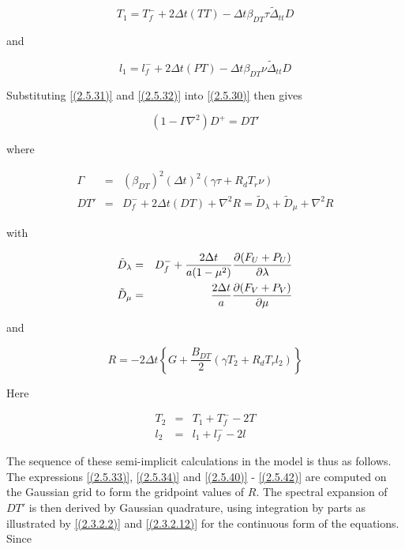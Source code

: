 \begin{equation}
T_1 = T^-_f + 2\Delta t (TT) - \Delta t \beta_{DT} \tau \tilde\Delta_{tt}D
\label{(2.5.33)}
\end{equation}

and

\begin{equation}
l_1 = l^-_f + 2\Delta t (PT) - \Delta t \beta_{DT} \nu \tilde\Delta_{tt}D
\label{(2.5.34)}
\end{equation}

Substituting \ref{(2.5.31)} and \ref{(2.5.32)} into \ref{(2.5.30)} then gives

\begin{equation}
(1 - \Gamma\nabla^2) D^+ = DT'
\label{(2.5.35)}
\end{equation}

where

\begin{eqnarray}
\Gamma & = & (\beta_{DT})^2(\Delta t)^2 (\gamma\tau +  R_dT_r\nu)
\label{(2.5.36)}\\
DT' & = & D^-_f + 2\Delta t(DT) + \nabla^2 R = \tilde{D}_{\lambda}
+ \tilde{D}_{\mu} + \nabla^2 R
\label{(2.5.37)}
\end{eqnarray}

with

\begin{eqnarray}
\tilde{D}_{\lambda} & = & D^-_f + \frac{2\Delta t}{a(1-\mu^2)}
\frac {\partial (F_U+P_U)} {\partial \lambda}
\label{(2.5.38)}\\
\tilde{D}_{\mu} & = & \frac{2\Delta t}{a}
\frac {\partial (F_V+P_V)} {\partial \mu}
\label{(2.5.39)}
\end{eqnarray}

and

\begin{equation}
R = - 2\Delta t\left\{G + \frac{B_{DT}}{2}
(\gamma T_2 + R_dT_rl_2)\right\}
\label{(2.5.40)}
\end{equation}

Here


\begin{eqnarray}
T_2 & = & T_1 + T^-_f - 2T
\label{(2.5.41)}\\
l_2 & = & l_1 + l^-_f - 2l
\label{(2.5.42)}
\end{eqnarray}

The sequence of these semi-implicit calculations in the model is thus
as follows. The expressions \ref{(2.5.33)}, \ref{(2.5.34)} and
\ref{(2.5.40)} - \ref{(2.5.42)} are computed on the Gaussian grid to
form the gridpoint values of $R$. The spectral expansion of $DT'$ is
then derived by Gaussian quadrature, using integration by parts as
illustrated by \ref{(2.3.2.2)} and \ref{(2.3.2.12)} for the continuous
form of the equations. Since

